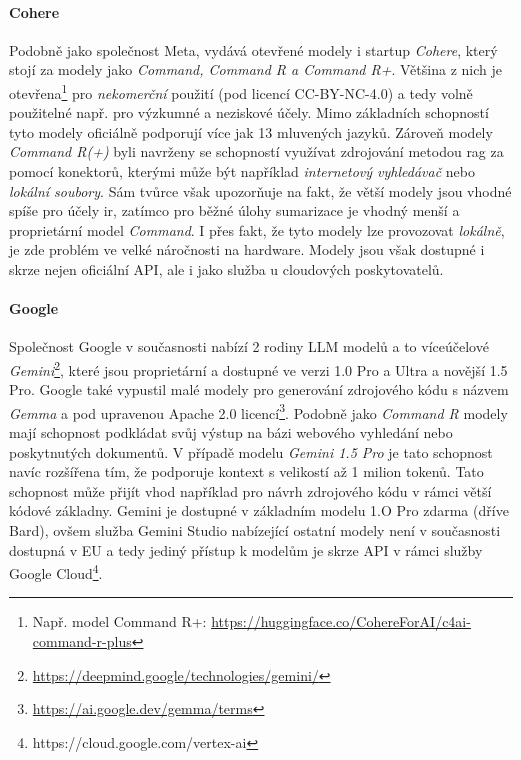 \documentclass[czech, ma, kiv, he, iso690numb, pdf, viewonly]{fasthesis}
\begin{document}
    \paragraph{Cohere} Podobně jako společnost Meta, vydává otevřené modely i startup \textit{Cohere}, který stojí za modely jako \textit{Command, Command R a Command R+}. Většina z nich je otevřena\footnote{Např. model Command R+: \url{https://huggingface.co/CohereForAI/c4ai-command-r-plus}} pro \emph{nekomerční} použití (pod licencí CC-BY-NC-4.0) a tedy volně použitelné např. pro výzkumné a neziskové účely. Mimo základních schopností tyto modely oficiálně podporují více jak 13 mluvených jazyků. Zároveň modely \textit{Command R(+)} byli navrženy se schopností využívat zdrojování metodou \Gls{rag} za pomocí konektorů, kterými může být například \textit{internetový vyhledávač} nebo \textit{lokální soubory}. Sám tvůrce však upozorňuje na fakt, že větší modely jsou vhodné spíše pro účely \Acrshort{ir}, zatímco pro běžné úlohy sumarizace je vhodný menší a proprietární model \textit{Command}. I přes fakt, že tyto modely lze provozovat \textit{lokálně}, je zde problém ve velké náročnosti na hardware. Modely jsou však dostupné i skrze nejen oficiální API, ale i jako služba u cloudových poskytovatelů. \cite{cohere_models} \cite{ruder_command_r}

    \paragraph{Google} Společnost Google v současnosti nabízí 2 rodiny LLM modelů a to víceúčelové \textit{Gemini}\footnote{\url{https://deepmind.google/technologies/gemini/}}, které jsou proprietární a dostupné ve verzi 1.0 Pro a Ultra a novější 1.5 Pro. Google také vypustil malé modely pro generování zdrojového kódu s názvem \textit{Gemma} a pod upravenou Apache 2.0 licencí\footnote{\url{https://ai.google.dev/gemma/terms}}. Podobně jako \textit{Command R} modely mají schopnost podkládat svůj výstup na bázi webového vyhledání nebo poskytnutých dokumentů. V případě modelu \textit{Gemini 1.5 Pro} je tato schopnost navíc rozšířena tím, že podporuje kontext s velikostí až 1 milion tokenů. Tato schopnost může přijít vhod například pro návrh zdrojového kódu v rámci větší kódové základny. Gemini je dostupné v základním modelu 1.O Pro zdarma (dříve Bard), ovšem služba Gemini Studio nabízející ostatní modely není v současnosti dostupná v EU a tedy jediný přístup k modelům je skrze API v rámci služby Google Cloud\footnote{https://cloud.google.com/vertex-ai}.
\end{document}
